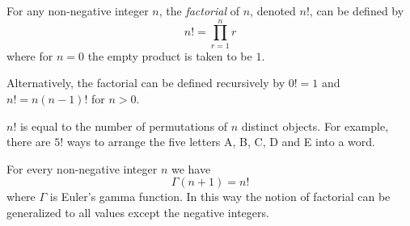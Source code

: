 \documentclass{article}
\begin{document}

For any non-negative integer $n$, the {\em factorial} of $n$, denoted $n!$, can be defined by
$$n!=\prod_{r=1}^n r$$
where for $n=0$ the empty product is taken to be $1$.

Alternatively, the factorial can be defined recursively by $0!=1$ and $n!=n(n-1)!$ for $n>0$.

$n!$ is equal to the number of permutations of $n$ distinct objects.
For example, there are $5!$ ways to arrange the five letters A, B, C, D and E into a word.

For every non-negative integer $n$ we have
$$\Gamma(n+1) = n!$$
where $\Gamma$ is Euler's gamma function.
In this way the notion of factorial can be generalized to all  values except the negative integers.
\end{document}
